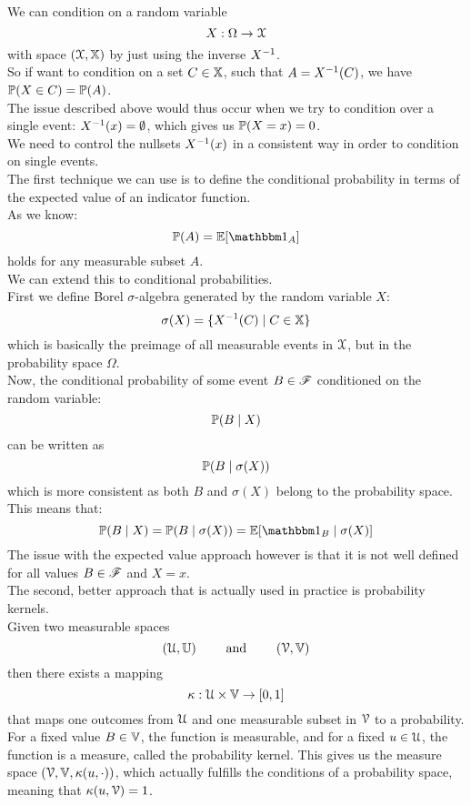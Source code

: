 \documentclass[12pt]{article}
\begin{document}
We can condition on a random variable
\[ X: \Omega \to \mathcal{X} \]
with space $(\mathcal{X}, \mathbb{X})$
by just using the inverse $X^{-1}$. \\
So if want to condition on a set $C \in \mathbb{X}$,
such that $A = X^{-1}(C)$,
we have $\mathbb{P}(X \in C) = \mathbb{P}(A)$. \\

The issue described above would thus occur
when we try to condition over a single event:
$X^{-1}(x) = \emptyset$,
which gives us $\mathbb{P}(X = x) = 0$. \\

We need to control the nullsets
$X^{-1}(x)$ in a consistent way
in order to condition on single events. \\

The first technique we can use
is to define the conditional probability
in terms of the expected value of
an indicator function. \\

As we know:
\[ \Pb(A) = \E[\indicator_A] \]
holds for any measurable subset $A$. \\

We can extend this to conditional
probabilities. \\

First we define Borel $\sigma$-algebra
generated by the random variable $X$:
\[ \sigma(X) = 
\{X^{-1}(C) \mid C \in \mathbb{X}\} \]
which is basically
the preimage of all measurable
events in $\mathcal{X}$,
but in the probability space $\Omega$. \\

Now, the conditional probability
of some event $B \in \mathscr{F}$
conditioned on the random variable:
\[ \mathbb{P}(B \mid X) \]
can be written as
\[ \mathbb{P}(B \mid \sigma(X)) \]
which is more consistent
as both $B$ and $\sigma(X)$
belong to the probability space. \\
This means that:
\[ \Pb(B \mid X) 
= \Pb(B \mid \sigma(X))
= \E[\indicator_B \mid \sigma(X)] \]
The issue with the expected
value approach however is that it is
not well defined for all values $B \in \mathscr{F}$
and $X = x$. \\

The second, better approach
that is actually used in practice is
probability kernels. \\

Given two measurable spaces
\[ (\mathcal{U}, \mathbb{U}) \qquad \text{ and } \qquad (\mathcal{V}, \mathbb{V}) \]
then there exists a mapping
\[ \kappa: \mathcal{U} \times \mathbb{V} \to [0, 1] \]
that maps one outcomes from $\mathcal{U}$
and one measurable subset in $\mathcal{V}$
to a probability. \\
For a fixed value $B \in \mathbb{V}$,
the function is measurable,
and for a fixed $u \in \mathcal{U}$,
the function is a measure,
called the probability kernel.
This gives us the measure space
$(\mathcal{V}, \mathbb{V}, \kappa(u, \cdot))$,
which actually fulfills the
conditions of a probability space,
meaning that $\kappa(u, \mathcal{V}) = 1$. \\
\end{document}
